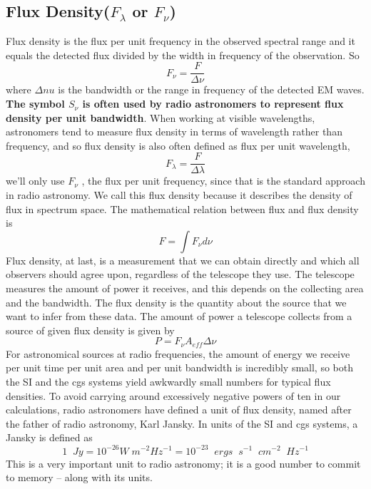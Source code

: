 \documentclass[10pt]{report}
\begin{document}
 \subsection{Flux Density($F_\lambda$ or $F_\nu$)}
 Flux density is the flux per unit frequency in the observed spectral range and it equals the detected flux divided by the width in frequency of the observation.  So
 \begin{equation}
 F_\nu=\frac{F}{\Delta\nu}
 \end{equation}
 where $\Delta nu$ is the bandwidth or the range in frequency of the detected EM waves.  \textbf{The symbol $S_\nu$ is often used by radio astronomers to represent flux density per unit bandwidth}.  When working at visible wavelengths, astronomers tend to measure flux density in terms of wavelength rather than frequency, and so flux density is also often defined as flux per unit wavelength, 
 \begin{equation}
 F_\lambda=\frac{F}{\Delta \lambda}
 \end{equation}
we'll only use $F_\nu$ , the flux per unit frequency, since that is the standard approach in radio astronomy. We call this flux density because it describes the density of flux in spectrum space.  The mathematical relation between flux and flux density is 
\begin{equation}
F=\int F_\nu d\nu
\end{equation}
Flux density, at last, is a measurement that we can obtain directly and which all observers should agree upon, regardless of the telescope they use.  The telescope measures the amount of power it receives, and this depends on the collecting area and the bandwidth.  The flux density is the quantity about the source that we want to infer from these data.  The amount of power a telescope collects from a source of given flux density is given by 
\begin{equation}
P=F_\nu A_{eff} \Delta \nu
\end{equation}
  For astronomical sources at radio frequencies, the amount of energy we receive per unit time per unit area and per unit bandwidth is incredibly small, so both the SI and the cgs systems yield awkwardly small numbers for typical flux densities.  To avoid carrying around excessively negative powers of ten in our calculations, radio astronomers have defined a unit of flux density, named after the father of radio astronomy, Karl Jansky.  In units of the SI and cgs systems, a Jansky is defined as 
\begin{equation}
  1 \;\;Jy=10^{-26} W\; m^{-2}Hz^{-1}=10^{-23}\;\; ergs \;\; s^{-1}\;\;cm^{-2}\;\;Hz^{-1}
\end{equation}
This is a very important unit to radio astronomy; it is a good number to commit to memory – along with its units.   
\end{document}
